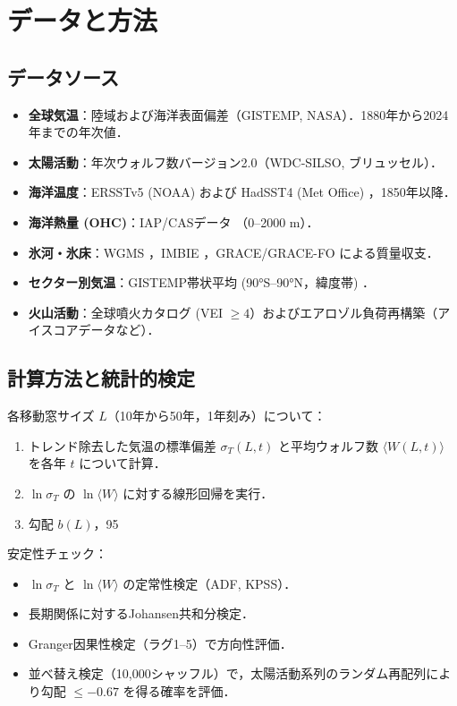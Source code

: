 \documentclass[11pt,a4paper]{article}
\begin{document}
	\section{データと方法}
	
	\subsection{データソース}
	
	\begin{itemize}
		\item \textbf{全球気温}：陸域および海洋表面偏差（GISTEMP, NASA）\cite{GISTEMP}．1880年から2024年までの年次値．
		\item \textbf{太陽活動}：年次ウォルフ数バージョン2.0（WDC‑SILSO, ブリュッセル）\cite{SILSO}．
		\item \textbf{海洋温度}：ERSSTv5 (NOAA) および HadSST4 (Met Office) \cite{ERSST, HADSST}，1850年以降．
		\item \textbf{海洋熱量 (OHC)}：IAP/CASデータ \cite{IAPOHC}（0–2000 m）．
		\item \textbf{氷河・氷床}：WGMS \cite{WGMS}，IMBIE \cite{IMBIE}，GRACE/GRACE-FO \cite{GRACE} による質量収支．
		\item \textbf{セクター別気温}：GISTEMP帯状平均 (90°S–90°N，緯度帯) \cite{GISTEMPZonal}．
		\item \textbf{火山活動}：全球噴火カタログ (VEI $\ge 4$）およびエアロゾル負荷再構築（アイスコアデータなど）\cite{VolcanoCatalog}．
	\end{itemize}
	
	\subsection{計算方法と統計的検定}
	
	各移動窓サイズ $L$（10年から50年，1年刻み）について：
	\begin{enumerate}
		\item トレンド除去した気温の標準偏差 $\sigma_T(L,t)$ と平均ウォルフ数 $\langle W(L,t) \rangle$ を各年 $t$ について計算．
		\item $\ln \sigma_T$ の $\ln \langle W \rangle$ に対する線形回帰を実行．
		\item 勾配 $b(L)$，95%
	\end{enumerate}
	
	安定性チェック：
	\begin{itemize}
		\item $\ln \sigma_T$ と $\ln \langle W \rangle$ の定常性検定（ADF, KPSS）．
		\item 長期関係に対するJohansen共和分検定．
		\item Granger因果性検定（ラグ1–5）で方向性評価．
		\item 並べ替え検定（10,000シャッフル）で，太陽活動系列のランダム再配列により勾配 $\le -0.67$ を得る確率を評価．
	\end{itemize}
	
\end{document}
